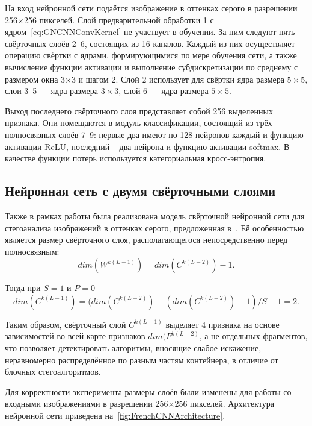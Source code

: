 На вход нейронной сети подаётся изображение в оттенках серого в разрешении 256×256 пикселей. Слой предварительной обработки 1 с ядром~\eqref{eq:GNCNNConvKernel} не участвует в обучении. За ним следуют пять свёрточных слоёв 2--6, состоящих из 16 каналов. Каждый из них осуществляет операцию свёртки с ядрами, формирующимися по мере обучения сети, а также вычисление функции активации и выполнение субдискретизации по среднему с размером окна 3×3 и шагом 2. Слой 2 использует для свёртки ядра размера $ 5 \times 5 $, слои 3--5 --- ядра размера $ 3 \times 3 $, слой 6 --- ядра размера $ 5 \times 5 $.

Выход последнего свёрточного слоя представляет собой 256 выделенных признака. Они помещаются в модуль классификации, состоящий из трёх полносвязных слоёв 7--9: первые два имеют по 128 нейронов каждый и функцию активации ReLU, последний – два нейрона и функцию активации softmax. В качестве функции потерь используется категориальная кросс-энтропия.

\subsection{Нейронная сеть с двумя свёрточными слоями}

Также в рамках работы была реализована модель свёрточной нейронной сети для стегоанализа изображений в оттенках серого, предложенная в~\cite{FrenchCNN}. Её особенностью является размер свёрточного слоя, располагающегося непосредственно перед полносвязным:
\begin{equation*}
dim(W^{k(L - 1)}) = dim(C^{k(L - 2)}) - 1.
\end{equation*}

Тогда при $ S = 1$ и $ P = 0 $
\begin{equation*}
dim(C^{k(L - 1)}) = (dim(C^{k(L - 2)}) - (dim(C^{k(L - 2)}) - 1) / S + 1 = 2.
\end{equation*}

Таким образом, свёрточный слой $ C^{k(L - 1)} $ выделяет 4 признака на основе зависимостей во всей карте признаков $ dim(F^{k(L - 2)} $, а не отдельных фрагментов, что позволяет детектировать алгоритмы, вносящие слабое искажение, неравномерно распределённое по разным частям контейнера, в отличие от блочных стегоалгоритмов.

Для корректности эксперимента размеры слоёв были изменены для работы со входными изображениями в разрешении 256×256 пикселей. Архитектура нейронной сети приведена на~\ref{fig:FrenchCNNArchitecture}.

